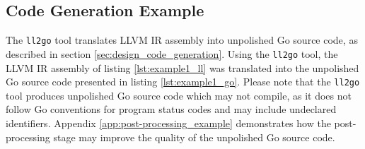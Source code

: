 
\subsection{Code Generation Example}
\label{app:code_generation_example}

The \texttt{ll2go} tool translates LLVM IR assembly into unpolished Go source code, as described in section \ref{sec:design_code_generation}. Using the \texttt{ll2go} tool, the LLVM IR assembly of listing \ref{lst:example1_ll} was translated into the unpolished Go source code presented in listing \ref{lst:example1_go}. Please note that the \texttt{ll2go} tool produces unpolished Go source code which may not compile, as it does not follow Go conventions for program status codes and may include undeclared identifiers. Appendix \ref{app:post-processing_example} demonstrates how the post-processing stage may improve the quality of the unpolished Go source code.



